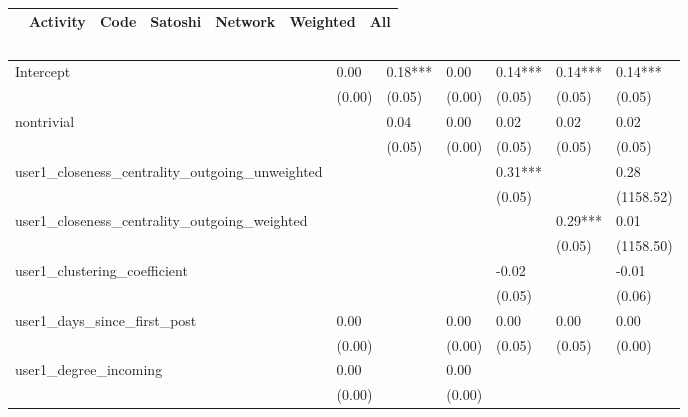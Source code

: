 \begin{table}
\caption{}
\begin{center}
\begin{tabular}{lcccccc}
\hline
                                               & Activity &   Code  & Satoshi & Network & Weighted &    All     \\
\hline
\hline
\end{tabular}
\begin{tabular}{lllllll}
Intercept                                      & 0.00     & 0.18*** & 0.00    & 0.14*** & 0.14***  & 0.14***    \\
                                               & (0.00)   & (0.05)  & (0.00)  & (0.05)  & (0.05)   & (0.05)     \\
nontrivial                                     &          & 0.04    & 0.00    & 0.02    & 0.02     & 0.02       \\
                                               &          & (0.05)  & (0.00)  & (0.05)  & (0.05)   & (0.05)     \\
user1_closeness_centrality_outgoing_unweighted &          &         &         & 0.31*** &          & 0.28       \\
                                               &          &         &         & (0.05)  &          & (1158.52)  \\
user1_closeness_centrality_outgoing_weighted   &          &         &         &         & 0.29***  & 0.01       \\
                                               &          &         &         &         & (0.05)   & (1158.50)  \\
user1_clustering_coefficient                   &          &         &         & -0.02   &          & -0.01      \\
                                               &          &         &         & (0.05)  &          & (0.06)     \\
user1_days_since_first_post                    & 0.00     &         & 0.00    & 0.00    & 0.00     & 0.00       \\
                                               & (0.00)   &         & (0.00)  & (0.05)  & (0.05)   & (0.00)     \\
user1_degree_incoming                          & 0.00     &         & 0.00    &         &          &            \\
                                               & (0.00)   &         & (0.00)  &         &          &            \\

\end{tabular}
\end{center}
\end{table}
